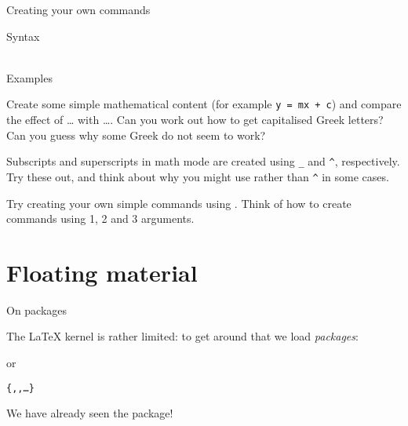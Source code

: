 
\begin{frame}{Creating your own commands}

  \begin{block}{Syntax}
    \\
      \\
  \end{block}
  
  \begin{block}{Examples}
     \\
  \end{block}

\end{frame}

\begin{exercise}
  Create some simple mathematical content (for example \verb"y = mx + c")
  and compare the effect of \cs{(} \ldots \cs{)} with \cs{[} \ldots \cs{]}.
  Can you work out how to get capitalised Greek letters? Can you
  guess why some Greek do not seem to work?
  
  Subscripts and superscripts in math mode are created using \verb"_"
  and \verb"^", respectively. Try these out, and think about why you
  might use  rather than \verb"^" in some cases.
  
  Try creating your own simple commands using . Think of
  how to create commands using 1, 2 and 3 arguments.
\end{exercise}


\section{Floating material}

\begin{frame}[fragile]{On packages}

  The \LaTeX{} kernel is rather limited: to get around that we
  load \emph{packages}:
  \begin{semiverbatim}
  \end{semiverbatim}
  or
  \begin{semiverbatim}
\texttt{\{,,\ldots\}}
  \end{semiverbatim} 
  We have already seen the  package! 
  
  \vspace{1 em}
  
  
\end{frame}

